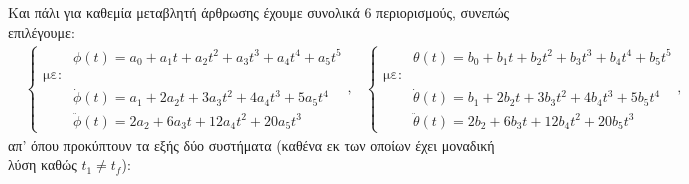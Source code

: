 \documentclass[12pt]{article} %
\numberwithin{equation}{section}  %
\begin{document}
Και πάλι για καθεμία μεταβλητή άρθρωσης έχουμε συνολικά 6 περιορισμούς, συνεπώς επιλέγουμε:
\begin{align}
    &\left\{
    \begin{aligned}
        &\phi(t) = a_0 + a_1 t + a_2 t^2 + a_3 t^3 + a_4 t^4 + a_5 t^5 \\
        \text{με:} \\
        &\dot\phi(t) = a_1 + 2 a_2 t + 3 a_3 t^2 + 4 a_4 t^3 + 5 a_5 t^4   \\
        &\ddot\phi(t) = 2 a_2 + 6 a_3 t + 12 a_4 t^2 + 20 a_5 t^3  
    \end{aligned},
    \right.
    &\left\{
    \begin{aligned}
        &\theta(t) = b_0 + b_1 t + b_2 t^2 + b_3 t^3 + b_4 t^4 + b_5 t^5 \\
    \text{με:}  \\
    &\dot\theta(t) = b_1 + 2 b_2 t + 3 b_3 t^2 + 4 b_4 t^3 + 5 b_5 t^4  \\
    &\ddot\theta(t) = 2 b_2 + 6 b_3 t + 12 b_4 t^2 + 20 b_5 t^3  
    \end{aligned},
    \right.
    \label{eq:phi_2}
\end{align}
απ' όπου προκύπτουν τα εξής δύο συστήματα (καθένα εκ των οποίων έχει μοναδική λύση καθώς $t_1 \neq t_f$):
\end{document}
